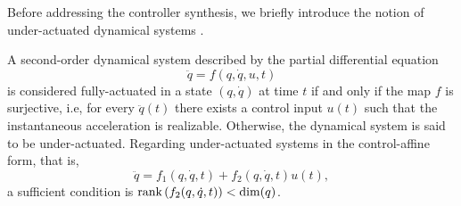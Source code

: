 


Before addressing the controller synthesis, we briefly introduce the notion of under-actuated dynamical systems \cite{Tedrake2009,Santina2019,Spong1998,Spong1996}. 

\begin{definition}
A second-order dynamical system described by the partial differential equation
\begin{equation}
\ddot{q} = f(q,\dot{q},u,t)
\end{equation}
is considered fully-actuated in a state $(q,\dot{q})$ at time $t$ if and only if the map $f$ is surjective, i.e, for every $\ddot{q}(t)$ there exists a control input $u(t)$ such that the instantaneous acceleration is realizable. Otherwise, the dynamical system is said to be under-actuated. Regarding under-actuated systems in the control-affine form, that is,
\begin{equation}
\ddot{q} = f_1(q,\dot{q},t) + f_2(q,\dot{q},t)u(t),
\end{equation}
a sufficient condition is $\textnormal{rank} \left(f_2(q,\dot{q},t)\right) < \dim(q)$.
\end{definition}

